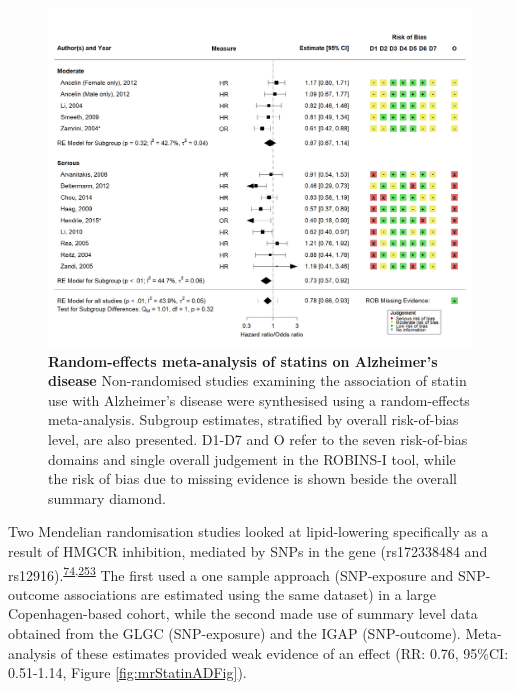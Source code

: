 \documentclass[a4paper, twoside]{templates/ociamthesis}
\begin{document}
\begin{figure}[H]
\includegraphics[width=1\linewidth]{figures/sys-rev/fp_obs_Statin-Ever_AD} \caption[Random-effects meta-analysis of statins on Alzheimer's disease]{\textbf{Random-effects meta-analysis of statins on Alzheimer's disease} Non-randomised studies examining the association of statin use with Alzheimer's disease were synthesised using a random-effects meta-analysis. Subgroup estimates, stratified by overall risk-of-bias level, are also presented. D1-D7 and O refer to the seven risk-of-bias domains and single overall judgement in the ROBINS-I tool, while the risk of bias due to missing evidence is shown beside the overall summary diamond.}\label{fig:obsStatinADFig}
\end{figure}

Two Mendelian randomisation studies looked at lipid-lowering specifically as a result of HMGCR inhibition, mediated by SNPs in the gene (rs172338484 and rs12916).\textsuperscript{\protect\hyperlink{ref-benn2017}{74},\protect\hyperlink{ref-so2017}{253}} The first used a one sample approach (SNP-exposure and SNP-outcome associations are estimated using the same dataset) in a large Copenhagen-based cohort, while the second made use of summary level data obtained from the GLGC (SNP-exposure) and the IGAP (SNP-outcome). Meta-analysis of these estimates provided weak evidence of an effect (RR: 0.76, 95\%CI: 0.51-1.14, Figure \ref{fig:mrStatinADFig}).

~\\
\end{document}

